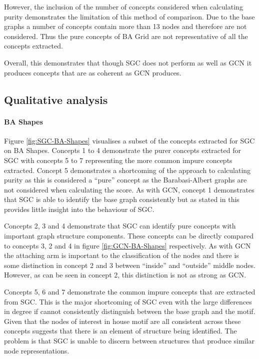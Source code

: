 However, the inclusion of the number of concepts considered when calculating purity demonstrates the limitation of this method of comparison.
Due to the base graphs a number of concepts contain more than 13 nodes and therefore are not considered.
Thus the pure concepts of BA Grid are not representative of all the concepts extracted.

Overall, this demonstrates that though SGC does not perform as well as GCN it produces concepts that are as coherent as GCN produces.

\subsection{Qualitative analysis}
\label{sec:concept-analysis}

\paragraph{BA Shapes}

Figure \ref{fig:SGC-BA-Shapes} visualises a subset of the concepts extracted for SGC on BA Shapes.
Concepts 1 to 4 demonstrate the purer concepts extracted for SGC with concepts 5 to 7 representing the more common impure concepts extracted.
Concept 5 demonstrates a shortcoming of the approach to calculating purity as this is considered a ``pure'' concept as the Barabasi-Albert graphs are not considered when calculating the score. 
As with GCN, concept 1 demonstrates that SGC is able to identify the base graph consistently but as stated in  this provides little insight into the behaviour of SGC.

Concepts 2, 3 and 4 demonstrate that SGC can identify pure concepts with important graph structure components.
These concepts can be directly compared to concepts 3, 2 and 4 in figure \ref{fig:GCN-BA-Shapes} respectively.
As with GCN the attaching arm is important to the classification of the nodes and there is some distinction in concept 2 and 3 between ``inside'' and ``outside'' middle nodes.
However, as can be seen in concept 2, this distinction is not as strong as GCN.

Concepts 5, 6 and 7 demonstrate the common impure concepts that are extracted from SGC.
This is the major shortcoming of SGC even with the large differences in degree if cannot consistently distinguish between the base graph and the motif.
Given that the nodes of interest in house motif are all consistent across these concepts suggests that there is an element of structure being identified.
The problem is that SGC is unable to discern between structures that produce similar node representations.

